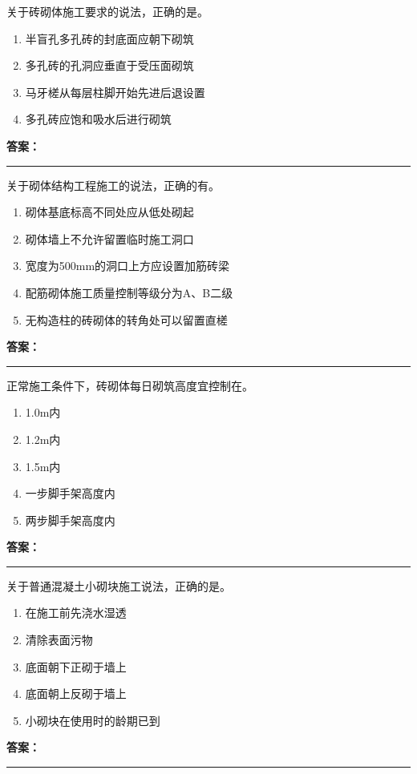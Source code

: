 \documentclass[UTF8,fontset=fandol,11pt]{ctexart}
\newcommand{\answerline}{\textcolor{answerred}{\rule{2.4cm}{0.7pt}}}
\begin{document}
\begin{quizbox}[title={第 24 题}]
关于砖砌体施工要求的说法，正确的是。\\
\begin{enumerate}[label=\Alph*.]
\item 半盲孔多孔砖的封底面应朝下砌筑
\item 多孔砖的孔洞应垂直于受压面砌筑
\item 马牙槎从每层柱脚开始先进后退设置
\item 多孔砖应饱和吸水后进行砌筑
\end{enumerate}
\textbf{\textcolor{answerred}{答案：}} \answerline
\end{quizbox}

\begin{quizbox}[title={第 25 题}]
关于砌体结构工程施工的说法，正确的有。\\
\begin{enumerate}[label=\Alph*.]
\item 砌体基底标高不同处应从低处砌起
\item 砌体墙上不允许留置临时施工洞口
\item 宽度为500mm的洞口上方应设置加筋砖梁
\item 配筋砌体施工质量控制等级分为A、B二级
\item 无构造柱的砖砌体的转角处可以留置直槎
\end{enumerate}
\textbf{\textcolor{answerred}{答案：}} \answerline
\end{quizbox}

\begin{quizbox}[title={第 26 题}]
正常施工条件下，砖砌体每日砌筑高度宜控制在。\\
\begin{enumerate}[label=\Alph*.]
\item 1.0m内
\item 1.2m内
\item 1.5m内
\item 一步脚手架高度内
\item 两步脚手架高度内
\end{enumerate}
\textbf{\textcolor{answerred}{答案：}} \answerline
\end{quizbox}

\begin{quizbox}[title={第 27 题}]
关于普通混凝土小砌块施工说法，正确的是。\\
\begin{enumerate}[label=\Alph*.]
\item 在施工前先浇水湿透
\item 清除表面污物
\item 底面朝下正砌于墙上
\item 底面朝上反砌于墙上
\item 小砌块在使用时的龄期已到
\end{enumerate}
\textbf{\textcolor{answerred}{答案：}} \answerline
\end{quizbox}
\end{document}

